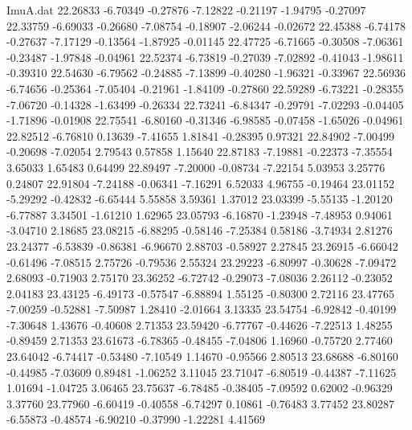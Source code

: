\begin{filecontents}{ImuA.dat}
  22.26833   -6.70349   -0.27876   -7.12822   -0.21197   -1.94795   -0.27097
  22.33759   -6.69033   -0.26680   -7.08754   -0.18907   -2.06244   -0.02672
  22.45388   -6.74178   -0.27637   -7.17129   -0.13564   -1.87925   -0.01145
  22.47725   -6.71665   -0.30508   -7.06361   -0.23487   -1.97848   -0.04961
  22.52374   -6.73819   -0.27039   -7.02892   -0.41043   -1.98611   -0.39310
  22.54630   -6.79562   -0.24885   -7.13899   -0.40280   -1.96321   -0.33967
  22.56936   -6.74656   -0.25364   -7.05404   -0.21961   -1.84109   -0.27860
  22.59289   -6.73221   -0.28355   -7.06720   -0.14328   -1.63499   -0.26334
  22.73241   -6.84347   -0.29791   -7.02293   -0.04405   -1.71896   -0.01908
  22.75541   -6.80160   -0.31346   -6.98585   -0.07458   -1.65026   -0.04961
  22.82512   -6.76810    0.13639   -7.41655    1.81841   -0.28395    0.97321
  22.84902   -7.00499   -0.20698   -7.02054    2.79543    0.57858    1.15640
  22.87183   -7.19881   -0.22373   -7.35554    3.65033    1.65483    0.64499
  22.89497   -7.20000   -0.08734   -7.22154    5.03953    3.25776    0.24807
  22.91804   -7.24188   -0.06341   -7.16291    6.52033    4.96755   -0.19464
  23.01152   -5.29292   -0.42832   -6.65444    5.55858    3.59361    1.37012
  23.03399   -5.55135   -1.20120   -6.77887    3.34501   -1.61210    1.62965
  23.05793   -6.16870   -1.23948   -7.48953    0.94061   -3.04710    2.18685
  23.08215   -6.88295   -0.58146   -7.25384    0.58186   -3.74934    2.81276
  23.24377   -6.53839   -0.86381   -6.96670    2.88703   -0.58927    2.27845
  23.26915   -6.66042   -0.61496   -7.08515    2.75726   -0.79536    2.55324
  23.29223   -6.80997   -0.30628   -7.09472    2.68093   -0.71903    2.75170
  23.36252   -6.72742   -0.29073   -7.08036    2.26112   -0.23052    2.04183
  23.43125   -6.49173   -0.57547   -6.88894    1.55125   -0.80300    2.72116
  23.47765   -7.00259   -0.52881   -7.50987    1.28410   -2.01664    3.13335
  23.54754   -6.92842   -0.40199   -7.30648    1.43676   -0.40608    2.71353
  23.59420   -6.77767   -0.44626   -7.22513    1.48255   -0.89459    2.71353
  23.61673   -6.78365   -0.48455   -7.04806    1.16960   -0.75720    2.77460
  23.64042   -6.74417   -0.53480   -7.10549    1.14670   -0.95566    2.80513
  23.68688   -6.80160   -0.44985   -7.03609    0.89481   -1.06252    3.11045
  23.71047   -6.80519   -0.44387   -7.11625    1.01694   -1.04725    3.06465
  23.75637   -6.78485   -0.38405   -7.09592    0.62002   -0.96329    3.37760
  23.77960   -6.60419   -0.40558   -6.74297    0.10861   -0.76483    3.77452
  23.80287   -6.55873   -0.48574   -6.90210   -0.37990   -1.22281    4.41569

\end{filecontents}
